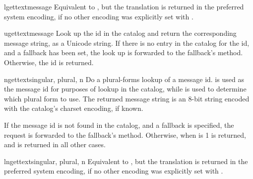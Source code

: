 \begin{methoddesc}[GNUTranslations]{lgettext}{message}
Equivalent to , but the translation is returned
in the preferred system encoding, if no other encoding was explicitly
set with .

\end{methoddesc}

\begin{methoddesc}[GNUTranslations]{ugettext}{message}
Look up the  id in the catalog and return the
corresponding message string, as a Unicode string.  If there is no
entry in the catalog for the  id, and a fallback has been
set, the look up is forwarded to the fallback's 
method.  Otherwise, the  id is returned.
\end{methoddesc}

\begin{methoddesc}[GNUTranslations]{ngettext}{singular, plural, n}
Do a plural-forms lookup of a message id.   is used as
the message id for purposes of lookup in the catalog, while  is
used to determine which plural form to use.  The returned message
string is an 8-bit string encoded with the catalog's charset encoding,
if known.

If the message id is not found in the catalog, and a fallback is
specified, the request is forwarded to the fallback's
 method.  Otherwise, when  is 1  is
returned, and  is returned in all other cases.

\end{methoddesc}

\begin{methoddesc}[GNUTranslations]{lngettext}{singular, plural, n}
Equivalent to , but the translation is returned
in the preferred system encoding, if no other encoding was explicitly
set with .

\end{methoddesc}

